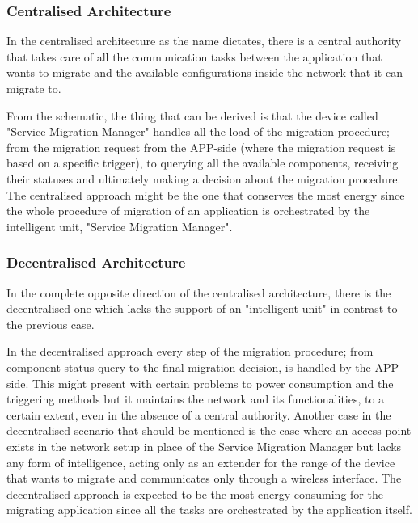 \subsubsection{Centralised Architecture}
In the centralised architecture as the name dictates, there is a central authority that takes care of all the communication tasks between the application that wants to migrate and the available configurations inside the network that it can migrate to.


From the schematic, the thing that can be derived is that the device called "Service Migration Manager" handles all the load of the migration procedure; from the migration request from the APP-side (where the migration request is based on a specific trigger), to querying all the available components, receiving their statuses and ultimately making a decision about the migration procedure. The centralised approach might be the one that conserves the most energy since the whole procedure of migration of an application is orchestrated by the intelligent unit, "Service Migration Manager".

\subsubsection{Decentralised Architecture}
In the complete opposite direction of the centralised architecture, there is the decentralised one which lacks the support of an "intelligent unit" in contrast to the previous case.


In the decentralised approach every step of the migration procedure; from component status query to the final migration decision, is handled by the APP-side. This might present with certain problems to power consumption and the triggering methods but it maintains the network and its functionalities, to a certain extent, even in the absence of a central authority. Another case in the decentralised scenario that should be mentioned is the case where an access point exists in the network setup in place of the Service Migration Manager but lacks any form of intelligence, acting only as an extender for the range of the device that wants to migrate and communicates only through a wireless interface. The decentralised approach is expected to be the most energy consuming for the migrating application since all the tasks are orchestrated by the application itself.

